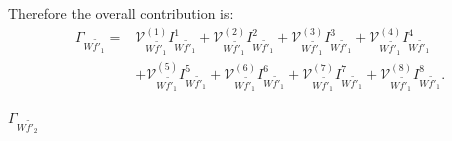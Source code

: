 \documentclass[final,3p,times]{elsarticle}
\begin{document}
Therefore the overall contribution is:
\begin{equation} 
\begin{aligned}
\Gamma_{W \tilde{f'}_1} = & \mathcal{V}_{W \tilde{f'}_1}^{(1)} I_{W \tilde{f'}_1}^{1} + \mathcal{V}_{W \tilde{f'}_1}^{(2)} I_{W \tilde{f'}_1}^{2} + \mathcal{V}_{W \tilde{f'}_1}^{(3)} I_{W \tilde{f'}_1}^{3} + \mathcal{V}_{W \tilde{f'}_1}^{(4)} I_{W \tilde{f'}_1}^{4} \\ & + \mathcal{V}_{W \tilde{f'}_1}^{(5)} I_{W \tilde{f'}_1}^{5} + \mathcal{V}_{W \tilde{f'}_1}^{(6)} I_{W \tilde{f'}_1}^{6} + \mathcal{V}_{W \tilde{f'}_1}^{(7)} I_{W \tilde{f'}_1}^{7} + \mathcal{V}_{W \tilde{f'}_1}^{(8)} I_{W \tilde{f'}_1}^{8}.
\end{aligned}
\end{equation}

\textbf{\underline{$\Gamma_{W \tilde{f'}_2}$}}
\end{document}
